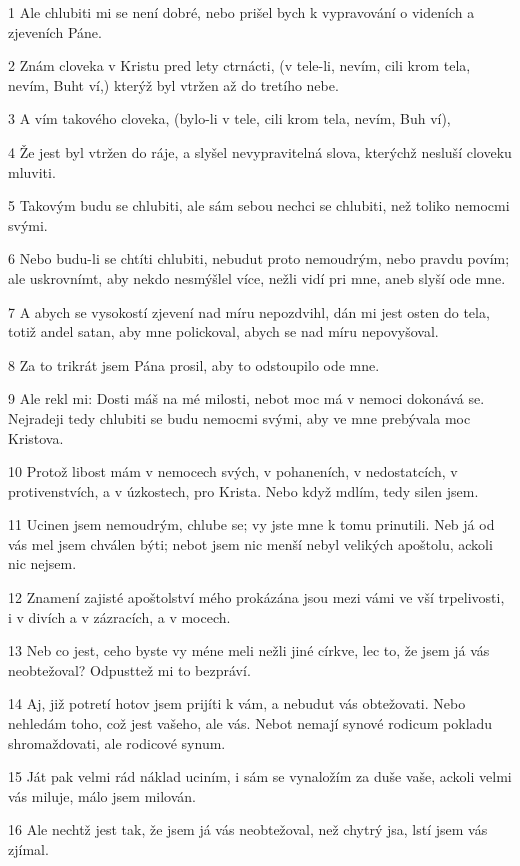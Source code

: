 \par 1 Ale chlubiti mi se není dobré, nebo prišel bych k vypravování o videních a zjeveních Páne.
\par 2 Znám cloveka v Kristu pred lety ctrnácti, (v tele-li, nevím, cili krom tela, nevím, Buht ví,) kterýž byl vtržen až do tretího nebe.
\par 3 A vím takového cloveka, (bylo-li v tele, cili krom tela, nevím, Buh ví),
\par 4 Že jest byl vtržen do ráje, a slyšel nevypravitelná slova, kterýchž nesluší cloveku mluviti.
\par 5 Takovým budu se chlubiti, ale sám sebou nechci se chlubiti, než toliko nemocmi svými.
\par 6 Nebo budu-li se chtíti chlubiti, nebudut proto nemoudrým, nebo pravdu povím; ale uskrovnímt, aby nekdo nesmýšlel více, nežli vidí pri mne, aneb slyší ode mne.
\par 7 A abych se vysokostí zjevení nad míru nepozdvihl, dán mi jest osten do tela, totiž andel satan, aby mne polickoval, abych se nad míru nepovyšoval.
\par 8 Za to trikrát jsem Pána prosil, aby to odstoupilo ode mne.
\par 9 Ale rekl mi: Dosti máš na mé milosti, nebot moc má v nemoci dokonává se. Nejradeji tedy chlubiti se budu nemocmi svými, aby ve mne prebývala moc Kristova.
\par 10 Protož libost mám v nemocech svých, v pohaneních, v nedostatcích, v protivenstvích, a v úzkostech, pro Krista. Nebo když mdlím, tedy silen jsem.
\par 11 Ucinen jsem nemoudrým, chlube se; vy jste mne k tomu prinutili. Neb já od vás mel jsem chválen býti; nebot jsem nic menší nebyl velikých apoštolu, ackoli nic nejsem.
\par 12 Znamení zajisté apoštolství mého prokázána jsou mezi vámi ve vší trpelivosti, i v divích a v zázracích, a v mocech.
\par 13 Neb co jest, ceho byste vy méne meli nežli jiné církve, lec to, že jsem já vás neobtežoval? Odpusttež mi to bezpráví.
\par 14 Aj, již potretí hotov jsem prijíti k vám, a nebudut vás obtežovati. Nebo nehledám toho, což jest vašeho, ale vás. Nebot nemají synové rodicum pokladu shromaždovati, ale rodicové synum.
\par 15 Ját pak velmi rád náklad uciním, i sám se vynaložím za duše vaše, ackoli velmi vás miluje, málo jsem milován.
\par 16 Ale nechtž jest tak, že jsem já vás neobtežoval, než chytrý jsa, lstí jsem vás zjímal.
